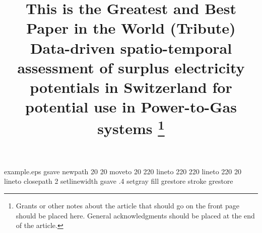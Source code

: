 %
%
%
%
%
%
\begin{filecontents*}{example.eps}
gsave
newpath
  20 20 moveto
  20 220 lineto
  220 220 lineto
  220 20 lineto
closepath
2 setlinewidth
gsave
  .4 setgray fill
grestore
stroke
grestore
\end{filecontents*}
%
\RequirePackage{fix-cm}
%
\documentclass[twocolumn]{svjour3}          %
%


%
\usepackage{mathptmx}      %
%



%



%
%



\title{This is the Greatest and Best Paper in the World (Tribute) Data-driven spatio-temporal assessment of surplus electricity potentials in Switzerland for potential use in Power-to-Gas systems
	\thanks{Grants or other notes
about the article that should go on the front page should be
placed here. General acknowledgments should be placed at the end of the article.}
}

